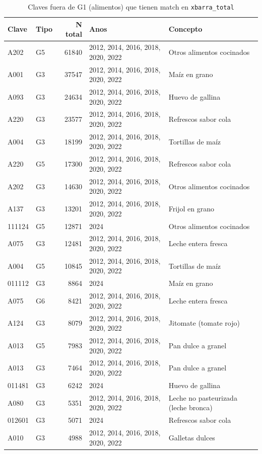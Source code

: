 \begin{table}[ht]
\centering
\caption{Claves fuera de G1 (alimentos) que tienen match en \texttt{xbarra\_total}} 
\label{tab:17b_claves_no_G1_con_kcal}
\begin{tabular}{llrll}
  \toprule
Clave & Tipo & N total & Anos & Concepto \\ 
  \midrule
A202 & G5 & 61840 & 2012, 2014, 2016, 2018, 2020, 2022 & Otros alimentos cocinados \\ 
  A001 & G3 & 37547 & 2012, 2014, 2016, 2018, 2020, 2022 & Maíz en grano \\ 
  A093 & G3 & 24634 & 2012, 2014, 2016, 2018, 2020, 2022 & Huevo de gallina \\ 
  A220 & G3 & 23577 & 2012, 2014, 2016, 2018, 2020, 2022 & Refrescos sabor cola \\ 
  A004 & G3 & 18199 & 2012, 2014, 2016, 2018, 2020, 2022 & Tortillas de maíz \\ 
  A220 & G5 & 17300 & 2012, 2014, 2016, 2018, 2020, 2022 & Refrescos sabor cola \\ 
  A202 & G3 & 14630 & 2012, 2014, 2016, 2018, 2020, 2022 & Otros alimentos cocinados \\ 
  A137 & G3 & 13201 & 2012, 2014, 2016, 2018, 2020, 2022 & Frijol en grano \\ 
  111124 & G5 & 12871 & 2024 & Otros alimentos cocinados \\ 
  A075 & G3 & 12481 & 2012, 2014, 2016, 2018, 2020, 2022 & Leche entera fresca \\ 
  A004 & G5 & 10845 & 2012, 2014, 2016, 2018, 2020, 2022 & Tortillas de maíz \\ 
  011112 & G3 & 8864 & 2024 & Maíz en grano \\ 
  A075 & G6 & 8421 & 2012, 2014, 2016, 2018, 2020, 2022 & Leche entera fresca \\ 
  A124 & G3 & 8079 & 2012, 2014, 2016, 2018, 2020, 2022 & Jitomate (tomate rojo) \\ 
  A013 & G5 & 7983 & 2012, 2014, 2016, 2018, 2020, 2022 & Pan dulce a granel \\ 
  A013 & G3 & 7464 & 2012, 2014, 2016, 2018, 2020, 2022 & Pan dulce a granel \\ 
  011481 & G3 & 6242 & 2024 & Huevo de gallina \\ 
  A080 & G3 & 5351 & 2012, 2014, 2016, 2018, 2020, 2022 & Leche no pasteurizada (leche bronca) \\ 
  012601 & G3 & 5071 & 2024 & Refrescos sabor cola \\ 
  A010 & G3 & 4988 & 2012, 2014, 2016, 2018, 2020, 2022 & Galletas dulces \\ 

\end{tabular}
\end{table}
